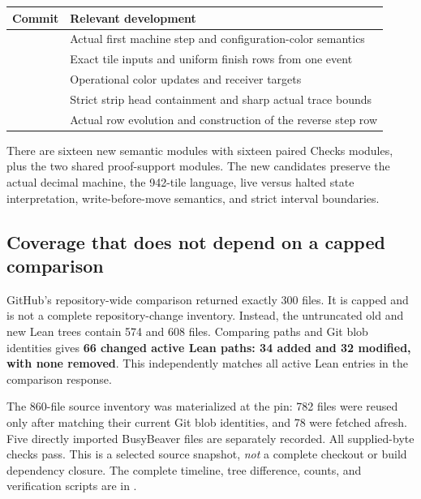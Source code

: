 \begin{tabularx}{\linewidth}{@{}L{1.14in}Y@{}}
\toprule
Commit & Relevant development \\
\midrule
{} & Actual first machine step and configuration-color semantics \\
 & Exact tile inputs and uniform finish rows from one event \\
 & Operational color updates and receiver targets \\
 & Strict strip head containment and sharp actual trace bounds \\
 & Actual row evolution and construction of the reverse step row \\
\bottomrule
\end{tabularx}

There are sixteen new semantic modules with sixteen paired Checks modules, plus the two shared proof-support modules. The new candidates preserve the actual decimal machine, the 942-tile language, live versus halted state interpretation, write-before-move semantics, and strict interval boundaries.

\subsection{Coverage that does not depend on a capped comparison}

GitHub's repository-wide comparison returned exactly 300 files. It is capped and is not a complete repository-change inventory. Instead, the untruncated old and new Lean trees contain 574 and 608 files. Comparing paths and Git blob identities gives \textbf{66 changed active Lean paths: 34 added and 32 modified, with none removed}. This independently matches all active Lean entries in the comparison response.

The 860-file source inventory was materialized at the pin: 782 files were reused only after matching their current Git blob identities, and 78 were fetched afresh. Five directly imported BusyBeaver files are separately recorded. All supplied-byte checks pass. This is a selected source snapshot, \emph{not} a complete checkout or build dependency closure. The complete timeline, tree difference, counts, and verification scripts are in .
